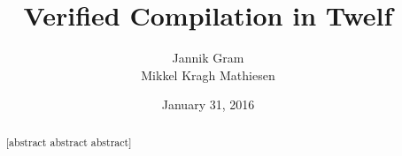 \title{Verified Compilation in Twelf}
\author{Jannik Gram\\Mikkel Kragh Mathiesen}
\date{January 31, 2016}

\thispagestyle{empty}

\maketitle

\begin{abstract}
[abstract abstract abstract]
\end{abstract}

\clearpage

\thispagestyle{empty}

\tableofcontents

\clearpage

